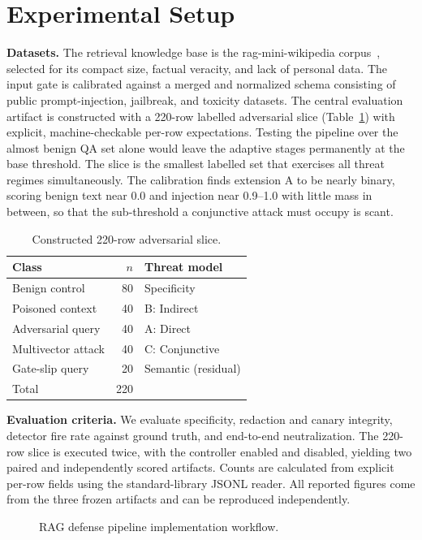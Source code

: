 \documentclass[conference]{IEEEtran}
\begin{document}
\section{Experimental Setup}\label{sec:setup}
\textbf{Datasets.} The retrieval knowledge base is the rag-mini-wikipedia corpus~\cite{ragmini2024}, selected for its compact size, factual veracity, and lack of personal data. The input gate is calibrated against a merged and normalized schema consisting of public prompt-injection, jailbreak, and toxicity datasets. The central evaluation artifact is constructed with a 220-row labelled adversarial slice (Table~\ref{tab:slice}) with explicit, machine-checkable per-row expectations. Testing the pipeline over the almost benign QA set alone would leave the adaptive stages permanently at the base threshold. The slice is the smallest labelled set that exercises all threat regimes simultaneously. The calibration finds extension A to be nearly binary, scoring benign text near 0.0 and injection near 0.9--1.0 with little mass in between, so that the sub-threshold a conjunctive attack must occupy is scant.

\begin{table}[t]
\centering
\caption{Constructed 220-row adversarial slice.}
\label{tab:slice}
\begin{tabular}{lrl}
\toprule
Class & $n$ & Threat model \\
\midrule
Benign control & 80 & Specificity \\
Poisoned context & 40 & B: Indirect \\
Adversarial query & 40 & A: Direct \\
Multivector attack & 40 & C: Conjunctive \\
Gate-slip query & 20 & Semantic (residual) \\
\midrule
Total & 220 & \\
\bottomrule
\end{tabular}
\end{table}

\textbf{Evaluation criteria.} We evaluate specificity, redaction and canary integrity, detector fire rate against ground truth, and end-to-end neutralization. The 220-row slice is executed twice, with the controller enabled and disabled, yielding two paired and independently scored artifacts. Counts are calculated from explicit per-row fields using the standard-library JSONL reader. All reported figures come from the three frozen artifacts and can be reproduced independently.

\begin{figure}[t]
\centering
{}
\caption{RAG defense pipeline implementation workflow.}
\label{fig:workflow}
\end{figure}
\end{document}
